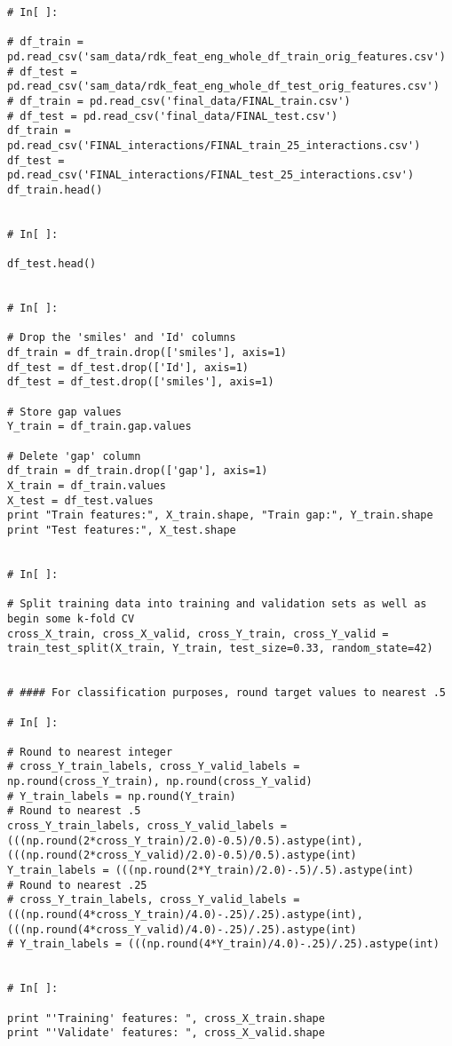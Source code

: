 \documentclass[11pt, oneside]{article}   	%
\begin{document}
\begin{lstlisting}
# In[ ]:

# df_train = pd.read_csv('sam_data/rdk_feat_eng_whole_df_train_orig_features.csv')
# df_test = pd.read_csv('sam_data/rdk_feat_eng_whole_df_test_orig_features.csv')
# df_train = pd.read_csv('final_data/FINAL_train.csv')
# df_test = pd.read_csv('final_data/FINAL_test.csv')
df_train = pd.read_csv('FINAL_interactions/FINAL_train_25_interactions.csv')
df_test = pd.read_csv('FINAL_interactions/FINAL_test_25_interactions.csv')
df_train.head()


# In[ ]:

df_test.head()


# In[ ]:

# Drop the 'smiles' and 'Id' columns
df_train = df_train.drop(['smiles'], axis=1)
df_test = df_test.drop(['Id'], axis=1)
df_test = df_test.drop(['smiles'], axis=1)

# Store gap values
Y_train = df_train.gap.values

# Delete 'gap' column
df_train = df_train.drop(['gap'], axis=1)
X_train = df_train.values
X_test = df_test.values
print "Train features:", X_train.shape, "Train gap:", Y_train.shape
print "Test features:", X_test.shape


# In[ ]:

# Split training data into training and validation sets as well as begin some k-fold CV
cross_X_train, cross_X_valid, cross_Y_train, cross_Y_valid = train_test_split(X_train, Y_train, test_size=0.33, random_state=42)


# #### For classification purposes, round target values to nearest .5

# In[ ]:

# Round to nearest integer
# cross_Y_train_labels, cross_Y_valid_labels = np.round(cross_Y_train), np.round(cross_Y_valid)
# Y_train_labels = np.round(Y_train)
# Round to nearest .5
cross_Y_train_labels, cross_Y_valid_labels = (((np.round(2*cross_Y_train)/2.0)-0.5)/0.5).astype(int), (((np.round(2*cross_Y_valid)/2.0)-0.5)/0.5).astype(int)
Y_train_labels = (((np.round(2*Y_train)/2.0)-.5)/.5).astype(int)
# Round to nearest .25
# cross_Y_train_labels, cross_Y_valid_labels = (((np.round(4*cross_Y_train)/4.0)-.25)/.25).astype(int), (((np.round(4*cross_Y_valid)/4.0)-.25)/.25).astype(int)
# Y_train_labels = (((np.round(4*Y_train)/4.0)-.25)/.25).astype(int)


# In[ ]:

print "'Training' features: ", cross_X_train.shape
print "'Validate' features: ", cross_X_valid.shape



\end{lstlisting}
\end{document}
